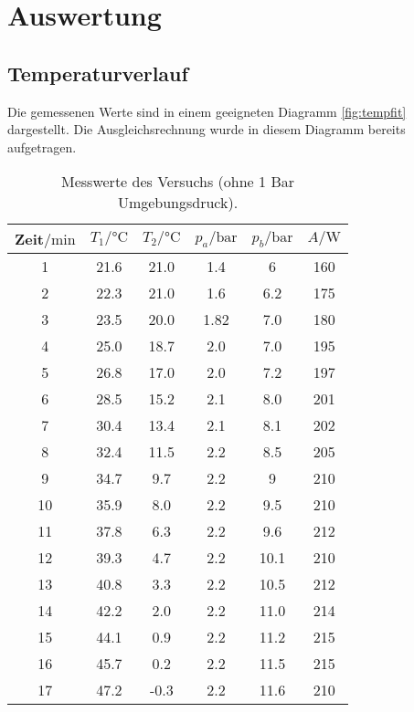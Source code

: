 \section{Auswertung}
\label{sec:Auswertung}
\subsection{Temperaturverlauf}
Die gemessenen Werte sind in einem geeigneten Diagramm \ref{fig:tempfit} dargestellt.
Die Ausgleichsrechnung wurde in diesem Diagramm bereits aufgetragen.
\begin{table}[H]
    \centering
    \caption{Messwerte des Versuchs (ohne 1 Bar Umgebungsdruck).}
    \label{tab:t1}
    \begin{tabular}{S[table-format=2.0] S S S S S[table-format=3.0]}
        \toprule
        {Zeit$/\si{\minute}$} & {$T_1/\si{\celsius}$} & {$T_2/\si{\celsius}$} & {$p_a/\si{\bar}$} & {$p_b/\si{\bar}$} & {$A/\si{\watt}$}\\
           & 21.6  & 21.0  & 1.4   & 6     & 160   \\
        2   & 22.3  & 21.0  & 1.6   & 6.2   & 175   \\
        3   & 23.5  & 20.0  & 1.82  & 7.0   & 180   \\
        4   & 25.0  & 18.7  & 2.0   & 7.0   & 195   \\
        5   & 26.8  & 17.0  & 2.0   & 7.2   & 197   \\
        6   & 28.5  & 15.2  & 2.1   & 8.0   & 201   \\
        7   & 30.4  & 13.4  & 2.1   & 8.1   & 202   \\
        8   & 32.4  & 11.5  & 2.2   & 8.5   & 205   \\
        9   & 34.7  & 9.7   & 2.2   & 9     & 210   \\
        10  & 35.9  & 8.0   & 2.2   & 9.5   & 210   \\
        11  & 37.8  & 6.3   & 2.2   & 9.6   & 212   \\
        12  & 39.3  & 4.7   & 2.2   & 10.1  & 210   \\
        13  & 40.8  & 3.3   & 2.2   & 10.5  & 212   \\
        14  & 42.2  & 2.0   & 2.2   & 11.0  & 214   \\
        15  & 44.1  & 0.9   & 2.2   & 11.2  & 215   \\
        16  & 45.7  & 0.2   & 2.2   & 11.5  & 215   \\
        17  & 47.2  & -0.3  & 2.2   & 11.6  & 210   \\
        \bottomrule
    \end{tabular}
\end{table}

